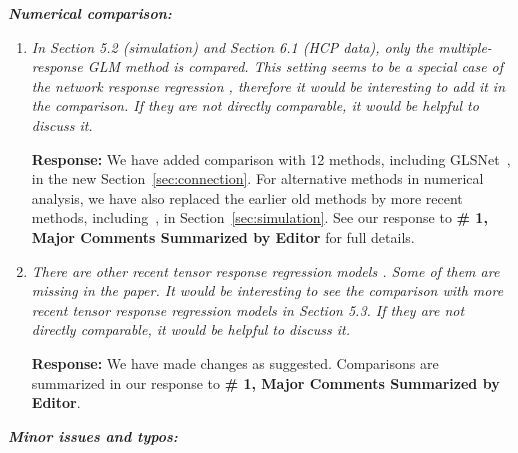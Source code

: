 \documentclass[11pt]{article}
\theoremstyle{plain}
\theoremstyle{definition}
\begin{document}
\vspace{0.2cm}
\textit{\textbf{Numerical comparison:}}
\begin{enumerate}
    \item \textit{In Section 5.2 (simulation) and Section 6.1 (HCP data), only the multiple-response GLM method is compared. This setting seems to be a special case of the network response regression \citep{zhang2018network}, therefore it would be interesting to add it in the comparison. If they are not directly comparable, it would be helpful to discuss it.}
    
    \textbf{Response:} We have added comparison with 12 methods, including GLSNet~\citep{zhang2018network}, in the new Section~\ref{sec:connection}. For alternative methods in numerical analysis, we have also replaced the earlier old methods by more recent methods, including~\cite{zhang2018network}, in Section~\ref{sec:simulation}. See our response to \textbf{\# 1, Major Comments Summarized by Editor} for full details. 
    

    \item \textit{There are other recent tensor response regression models \citep{li2017parsimonious,sun2017store,raskutti2019convex}. Some of them are missing in the paper. It would be interesting to see the comparison with more recent tensor response regression models in Section 5.3. If they are not directly comparable, it would be helpful to discuss it.}
    
    \textbf{Response:} We have made changes as suggested. Comparisons are summarized in our response to \textbf{\# 1, Major Comments Summarized by Editor}. 
\end{enumerate}

\vspace{0.2cm}
\textit{\textbf{Minor issues and typos:}}
\end{document}
